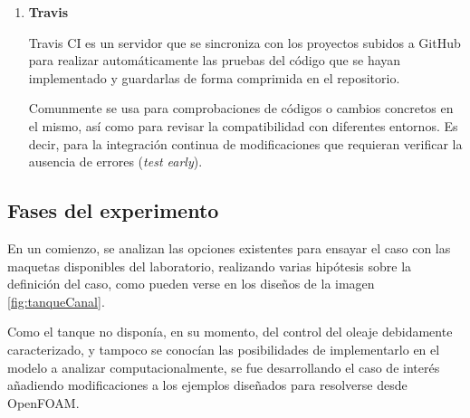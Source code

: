 \begin{enumerate}
\begin{itemize}
\item
  Imágenes creadas por la comunidad y por los propios desarrolladores de
  algunos programas, las cuales se pueden descargar desde
  Docker Hub \cite{dockerhub}.
\item
  Artículo que describe la imagen de OpenFOAM, para poder ser ejecutada
  desde Docker: ``How
  to install OpenFOAM anywhere with Docker''\footnote{\url{https://www.cfdengine.com/blog/how-to-install-openfoam-anywhere-with-docker/}}.
\item
  ``Dockerfile''\footnote{\url{https://hub.docker.com/r/quantumhpc/openfoam/~/dockerfile/}}
  es donde se guardan las instrucciones de lo que contiene el contenedor
  para crear la imagen a ejecutar. Es un archivo equivalente a un
  \emph{script}.
\item
  Para compartir una carpeta del
  anfitrión con el contenedor, se necesita arrancar la imagen con el
  argumento \texttt{:Z}, de forma que se puedan saltar los permisos de
  seguridad de linux.
\end{itemize}

\item
\textbf{Travis}

Travis CI es un servidor que se sincroniza con los proyectos subidos a
GitHub para realizar automáticamente las pruebas del código que se hayan
implementado y guardarlas de forma comprimida en el repositorio.

Comunmente se usa para comprobaciones de códigos o cambios concretos en
el mismo, así como para revisar la compatibilidad con diferentes
entornos. Es decir, para la integración continua de modificaciones que
requieran verificar la ausencia de errores (\emph{test early}).
\end{enumerate}

\subsection{Fases del experimento}\label{header-n420}

En un comienzo, se analizan las opciones existentes para ensayar el caso
con las maquetas disponibles del laboratorio, realizando varias
hipótesis sobre la definición del caso, como pueden verse en los diseños de la imagen \autoref{fig:tanqueCanal}.

Como el tanque no disponía, en su momento, del control del oleaje
debidamente caracterizado, y tampoco se conocían las posibilidades de
implementarlo en el modelo a analizar computacionalmente, se fue
desarrollando el caso de interés añadiendo modificaciones a los ejemplos
diseñados para resolverse desde OpenFOAM.

